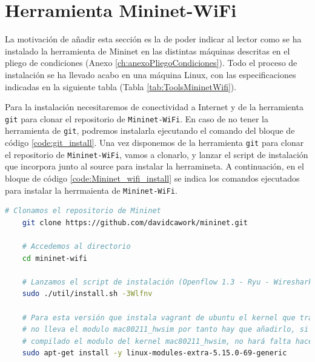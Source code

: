 \section{Herramienta Mininet-WiFi}
\label{sec:ToolsMininetwifi}
La motivación de añadir esta sección es la de poder indicar al lector como se ha instalado la herramienta de Mininet en las distintas máquinas descritas en el pliego de condiciones (Anexo \ref{ch:anexoPliegoCondiciones}). Todo el proceso de instalación se ha llevado acabo en una máquina Linux, con las especificaciones indicadas en la siguiente tabla (Tabla \ref{tab:ToolsMininetWifi}).

\begin{table}[ht!]
    \centering
    \caption{Especificaciones máquina de instalación Mininet-WiFi}
    \label{tab:ToolsMininetWifi}
\end{table}

Para la instalación necesitaremos de conectividad a Internet y de la herramienta \texttt{git} para clonar el repositorio de \texttt{Mininet-WiFi}. En caso de no tener la herramienta de \texttt{git}, podremos instalarla ejecutando el comando del bloque de código \ref{code:git_install}. Una vez disponemos de la herramienta \texttt{git} para clonar el repositorio de \texttt{Mininet-WiFi}, vamos a clonarlo, y lanzar el script de instalación que incorpora junto al source para instalar la herramineta. A continuación, en el bloque de código \ref{code:Mininet_wifi_install} se indica los comandos ejecutados para instalar la herrmaienta de \texttt{Mininet-WiFi}.


\begin{lstlisting}[language= bash, style=Consola2, caption={Instalación de la herramienta Mininet-WiFi},label=code:Mininet_wifi_install]
    # Clonamos el repositorio de Mininet
    git clone https://github.com/davidcawork/mininet.git

    # Accedemos al directorio
    cd mininet-wifi

    # Lanzamos el script de instalación (Openflow 1.3 - Ryu - Wireshark dissector)
    sudo ./util/install.sh -3Wlfnv

    # Para esta versión que instala vagrant de ubuntu el kernel que trae
    # no lleva el modulo mac80211_hwsim por tanto hay que añadirlo, si tu version tiene
    # compilado el modulo del kernel mac80211_hwsim, no hará falta hacer esto
    sudo apt-get install -y linux-modules-extra-5.15.0-69-generic
\end{lstlisting}
\vspace{1cm}

